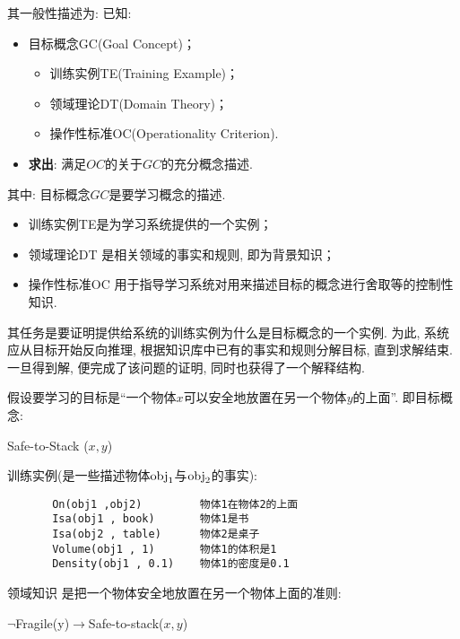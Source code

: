 其一般性描述为: 已知:
\begin{itemize}
\item 目标概念GC(Goal Concept)；
   \begin{itemize}
         \item 训练实例TE(Training Example)；
         \item 领域理论DT(Domain Theory)；
         \item 操作性标准OC(Operationality Criterion).
   \end{itemize}
\item \textbf{求出}: 满足$OC$的关于$GC$的充分概念描述.
\end{itemize}
其中: 目标概念$GC$是要学习概念的描述.

\begin{itemize}
\item 训练实例TE是为学习系统提供的一个实例；
\item 领域理论DT 是相关领域的事实和规则, 即为背景知识；
\item 操作性标准OC 用于指导学习系统对用来描述目标的概念进行舍取等的控制性知识.
\end{itemize}

其任务是要证明提供给系统的训练实例为什么是目标概念的一个实例. 为此, 系统应从目标开始反向推理, 根据知识库中已有的事实和规则分解目标, 直到求解结束. 一旦得到解, 便完成了该问题的证明, 同时也获得了一个解释结构.

\begin{example}
假设要学习的目标是“一个物体$x$可以安全地放置在另一个物体$y$的上面”. 即目标概念:
\begin{center}
  Safe-to-Stack ($x, y$)
\end{center}

训练实例(是一些描述物体$\textup{obj}_1$与$\textup{obj}_2$的事实):
\begin{Verbatim}
       On(obj1 ,obj2)         物体1在物体2的上面
       Isa(obj1 , book)       物体1是书
       Isa(obj2 , table)      物体2是桌子
       Volume(obj1 , 1)       物体1的体积是1
       Density(obj1 , 0.1)    物体1的密度是0.1
\end{Verbatim}

领域知识   是把一个物体安全地放置在另一个物体上面的准则:
\begin{center}
  $\neg $Fragile(y)$\rightarrow$Safe-to-stack($x, y$)
\end{center}
\vspace{-0.4cm}
\end{example}

